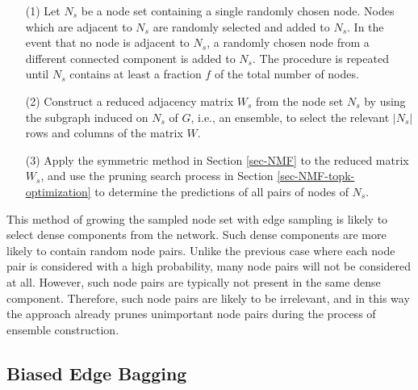 \vspace{-1ex}
\begin{enumerate}
\item[(1)]Let $N_s$ be a node set containing a single randomly chosen
node. Nodes which are adjacent to $N_s$ are randomly selected and
added to $N_s$. In the event that no node is adjacent to $N_s$, a
randomly chosen node from a different connected component is added
to $N_s$. The procedure is repeated until $N_s$ contains at least a
fraction $f$ of the total number of nodes.
 
\item[(2)]  Construct a reduced
adjacency matrix $W_s$ from the node set $N_s$ by using the subgraph
induced on $N_s$ of $G$, i.e., an ensemble, to select the relevant $|N_s|$ rows and columns of the matrix $W$.
 
\item[(3)] Apply the symmetric \NMF method in Section \ref{sec-NMF}
to the reduced matrix $W_s$, and use the pruning search process in Section \ref{sec-NMF-topk-optimization} to determine the predictions of all pairs of nodes  of $N_s$.
\end{enumerate}
\vspace{-1ex}


This method of growing the sampled node set with edge sampling is
likely to select dense components from the network. Such dense
components are more likely to contain random node pairs. Unlike the
previous case where each node pair is considered with a high
probability, many node pairs will not be considered at all. However,
such node pairs are typically not present in the same dense
component. Therefore, such node pairs are likely to be irrelevant,
and in this way the approach already prunes unimportant node pairs
during the process of ensemble construction.



\subsection{Biased Edge Bagging}

